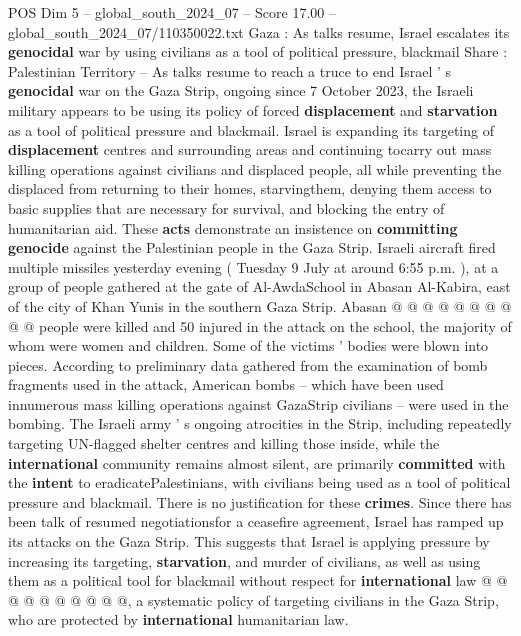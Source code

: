 \begin{textsample}{POS Dim 5 – global\_south\_2024\_07 – Score 17.00 – global\_south\_2024\_07/110350022.txt}  \label{ex:f5_pos_172}
Gaza : As talks resume, Israel escalates its \textbf{genocidal} war by using civilians as a tool of political pressure, blackmail Share : Palestinian Territory -- As talks resume to reach a truce to end Israel ' s \textbf{genocidal} war on the Gaza Strip, ongoing since 7 October 2023, the Israeli military appears to be using its policy of forced \textbf{displacement} and \textbf{starvation} as a tool of political pressure and blackmail.
Israel is expanding its targeting of \textbf{displacement} centres and surrounding areas and continuing tocarry out mass killing operations against civilians and displaced people, all while preventing the displaced from returning to their homes, starvingthem, denying them access to basic supplies that are necessary for survival, and blocking the entry of humanitarian aid.
These \textbf{acts} demonstrate an insistence on \textbf{committing} \textbf{genocide} against the Palestinian people in the Gaza Strip.
Israeli aircraft fired multiple missiles yesterday evening ( Tuesday 9 July at around 6:55 p.m. ), at a group of people gathered at the gate of Al-AwdaSchool in Abasan Al-Kabira, east of the city of Khan Yunis in the southern Gaza Strip.
Abasan @ @ @ @ @ @ @ @ @ @ people were killed and 50 injured in the attack on the school, the majority of whom were women and children.
Some of the victims ' bodies were blown into pieces.
According to preliminary data gathered from the examination of bomb fragments used in the attack, American bombs -- which have been used innumerous mass killing operations against GazaStrip civilians -- were used in the bombing.
The Israeli army ' s ongoing atrocities in the Strip, including repeatedly targeting UN-flagged shelter centres and killing those inside, while the \textbf{international} community remains almost silent, are primarily \textbf{committed} with the \textbf{intent} to eradicatePalestinians, with civilians being used as a tool of political pressure and blackmail.
There is no justification for these \textbf{crimes}.
Since there has been talk of resumed negotiationsfor a ceasefire agreement, Israel has ramped up its attacks on the Gaza Strip.
This suggests that Israel is applying pressure by increasing its targeting, \textbf{starvation}, and murder of civilians, as well as using them as a political tool for blackmail without respect for \textbf{international} law @ @ @ @ @ @ @ @ @ @, a systematic policy of targeting civilians in the Gaza Strip, who are protected by \textbf{international} humanitarian law.

\end{textsample}
